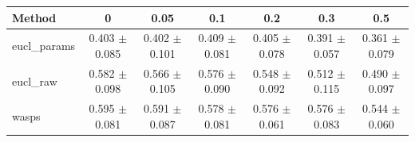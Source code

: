 \begin{table}[htbp]
\centering
\begin{NiceTabular}{lcccccc}
\toprule
Method & 0 & 0.05 & 0.1 & 0.2 & 0.3 & 0.5 \\
\midrule
eucl\_params & 0.403 $\pm$ 0.085 & 0.402 $\pm$ 0.101 & 0.409 $\pm$ 0.081 & 0.405 $\pm$ 0.078 & 0.391 $\pm$ 0.057 & 0.361 $\pm$ 0.079 \\
eucl\_raw & 0.582 $\pm$ 0.098 & 0.566 $\pm$ 0.105 & 0.576 $\pm$ 0.090 & 0.548 $\pm$ 0.092 & 0.512 $\pm$ 0.115 & 0.490 $\pm$ 0.097 \\
wasps & 0.595 $\pm$ 0.081 & 0.591 $\pm$ 0.087 & 0.578 $\pm$ 0.081 & 0.576 $\pm$ 0.061 & 0.576 $\pm$ 0.083 & 0.544 $\pm$ 0.060 \\
\bottomrule
\end{NiceTabular}
\label{tab:sens_cpazmal_decimation_knn}
\end{table}
